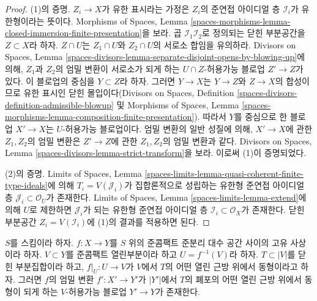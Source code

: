 \begin{proof}
(1)의 증명. $Z_i \to X$가 유한 표시라는 가정은 $Z_i$의 준연접
아이디얼 층 $\mathcal{I}_i$가 유한형이라는 뜻이다. Morphisms of
Spaces, Lemma
\ref{spaces-morphisms-lemma-closed-immersion-finite-presentation}을 보라.
곱 $\mathcal{I}_1 \mathcal{I}_2$로 정의되는 닫힌 부분공간을
$Z \subset X$라 하자. $Z \cap U$는 $Z_1 \cap U$와 $Z_2 \cap U$의
서로소 합임을 유의하라. Divisors on Spaces, Lemma
\ref{spaces-divisors-lemma-separate-disjoint-opens-by-blowing-up}에 의해,
$Z_1$과 $Z_2$의 엄밀 변환이 서로소가 되게 하는
$U \cap Z$-허용가능 블로업 $Z' \to Z$가 있다.
이 블로업의 중심을 $Y \subset Z$라 하자.
그러면 $Y \to X$는 $Y \to Z$와 $Z \to X$의 합성이므로 유한 표시인
닫힌 몰입이다(Divisors on Spaces, Definition
\ref{spaces-divisors-definition-admissible-blowup} 및
Morphisms of Spaces, Lemma
\ref{spaces-morphisms-lemma-composition-finite-presentation}).
따라서 $Y$를 중심으로 한 블로업 $X' \to X$는 $U$-허용가능
블로업이다. 엄밀 변환의 일반 성질에 의해, $X' \to X$에 관한
$Z_1, Z_2$의 엄밀 변환은 $Z' \to Z$에 관한 $Z_1, Z_2$의 엄밀
변환과 같다. Divisors on Spaces, Lemma
\ref{spaces-divisors-lemma-strict-transform}을 보라. 이로써 (1)이
증명되었다.

\medskip\noindent
(2)의 증명. Limits of Spaces, Lemma
\ref{spaces-limits-lemma-quasi-coherent-finite-type-ideals}에 의해
$T_i = V(\mathcal{J}_i)$가 집합론적으로 성립하는 유한형 준연접
아이디얼 층 $\mathcal{J}_i \subset \mathcal{O}_U$가 존재한다.
Limits of Spaces, Lemma \ref{spaces-limits-lemma-extend}에 의해
$U$로 제한하면 $\mathcal{J}_i$가 되는 유한형 준연접 아이디얼 층
$\mathcal{I}_i \subset \mathcal{O}_X$가 존재한다.
닫힌 부분공간 $Z_i = V(\mathcal{I}_i)$에 (1)의 결과를 적용하면 된다.
\end{proof}

\begin{lemma}
\label{lemma-blowup-iso-along}
$S$를 스킴이라 하자. $f : X \to Y$를 $S$ 위의 준콤팩트 준분리
대수 공간 사이의 고유 사상이라 하자. $V \subset Y$를 준콤팩트
열린부분이라 하고 $U = f^{-1}(V)$라 하자. $T \subset |V|$를 닫힌
부분집합이라 하고, $f|_U : U \to V$가 $V$에서 $T$의 어떤 열린
근방 위에서 동형이라고 하자. 그러면 $f$의 엄밀 변환
$f' : X' \to Y'$가 $|Y'|$에서 $T$의 폐포의 어떤 열린 근방 위에서
동형이 되게 하는 $V$-허용가능 블로업 $Y' \to Y$가 존재한다.
\end{lemma}

